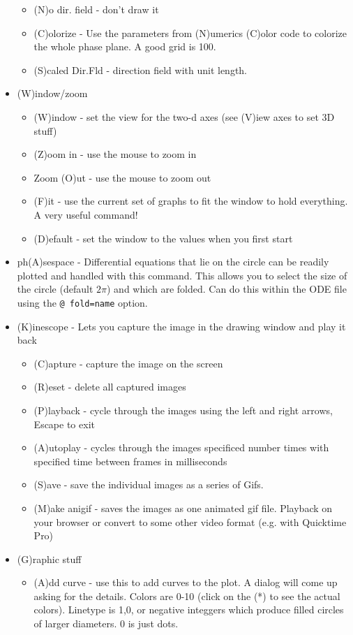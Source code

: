 \documentclass{article}
\begin{document}
\begin{itemize}
\begin{itemize}
\item (N)o dir. field - don't draw it
\item (C)olorize - Use the parameters from (N)umerics (C)olor code to colorize the whole phase plane. A good grid is 100.
\item (S)caled Dir.Fld - direction field with unit length.
\end{itemize}
\item (W)indow/zoom 
\begin{itemize}
\item (W)indow - set the view for the two-d axes (see (V)iew axes to set 3D stuff)
\item (Z)oom in - use the mouse to zoom in
\item Zoom (O)ut - use the mouse to zoom out
\item (F)it - use the current set of graphs to fit the window to hold everything. A very useful command!
\item (D)efault - set the window to the values when you first start
\end{itemize}
\item ph(A)sespace - Differential equations that lie on the circle can be readily plotted and handled with this command. This allows you to select the size of the circle (default $2\pi$) and which are folded. Can do this within the ODE file using the {\tt @ fold=name} option.
\item (K)inescope - Lets you capture the image in the drawing window and play it back
\begin{itemize}
\item (C)apture - capture the image on the screen
\item (R)eset - delete all captured images
\item (P)layback - cycle through the images using the left and right arrows, Escape to exit
\item (A)utoplay - cycles through the images specificed number times with specified time between frames in milliseconds
\item (S)ave - save the individual images as a series of Gifs. 
\item (M)ake anigif - saves the images as one animated gif file. Playback on your browser or convert to some other video format (e.g. with Quicktime Pro)
\end{itemize}
\item (G)raphic stuff 
\begin{itemize}
\item (A)dd curve - use this to add curves to the plot. A dialog will come up asking for the details. Colors are 0-10 (click on the (*) to see the actual colors). Linetype is 1,0, or negative integgers which produce filled circles of larger diameters. 0 is just dots.

\end{itemize}
\end{itemize}
\end{document}
